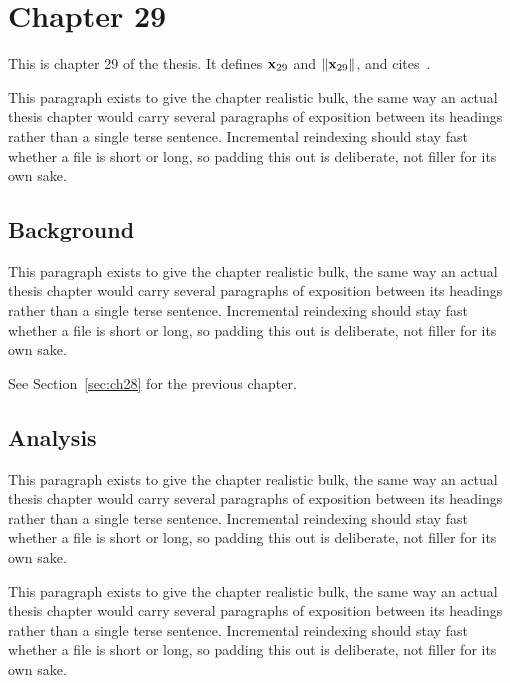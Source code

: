 \section{Chapter 29}
\label{sec:ch29}

This is chapter 29 of the thesis. It defines $\mathbf{x}_{29}$ and $\lVert \mathbf{x}_{29} \rVert$, and cites~\cite{ref1}.

This paragraph exists to give the chapter realistic bulk, the same way an actual thesis chapter would carry several paragraphs of exposition between its headings rather than a single terse sentence. Incremental reindexing should stay fast whether a file is short or long, so padding this out is deliberate, not filler for its own sake.

\subsection{Background}
\label{sec:ch29:background}

This paragraph exists to give the chapter realistic bulk, the same way an actual thesis chapter would carry several paragraphs of exposition between its headings rather than a single terse sentence. Incremental reindexing should stay fast whether a file is short or long, so padding this out is deliberate, not filler for its own sake.

See Section~\ref{sec:ch28} for the previous chapter.

\subsection{Analysis}
\label{sec:ch29:analysis}

This paragraph exists to give the chapter realistic bulk, the same way an actual thesis chapter would carry several paragraphs of exposition between its headings rather than a single terse sentence. Incremental reindexing should stay fast whether a file is short or long, so padding this out is deliberate, not filler for its own sake.

This paragraph exists to give the chapter realistic bulk, the same way an actual thesis chapter would carry several paragraphs of exposition between its headings rather than a single terse sentence. Incremental reindexing should stay fast whether a file is short or long, so padding this out is deliberate, not filler for its own sake.

